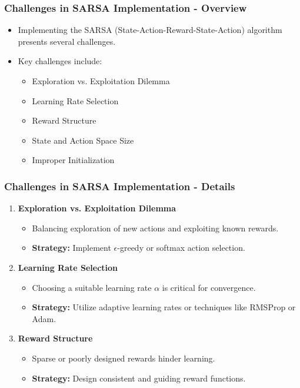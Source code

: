 \documentclass{beamer}
\begin{document}
\begin{frame}[fragile]
    \frametitle{Challenges in SARSA Implementation - Overview}
    \begin{itemize}
        \item Implementing the SARSA (State-Action-Reward-State-Action) algorithm presents several challenges.
        \item Key challenges include:
            \begin{itemize}
                \item Exploration vs. Exploitation Dilemma
                \item Learning Rate Selection
                \item Reward Structure
                \item State and Action Space Size
                \item Improper Initialization
            \end{itemize}
    \end{itemize}
\end{frame}

\begin{frame}[fragile]
    \frametitle{Challenges in SARSA Implementation - Details}
    \begin{enumerate}
        \item \textbf{Exploration vs. Exploitation Dilemma}
            \begin{itemize}
                \item Balancing exploration of new actions and exploiting known rewards.
                \item \textbf{Strategy:} Implement $\epsilon$-greedy or softmax action selection.
            \end{itemize}
        \item \textbf{Learning Rate Selection}
            \begin{itemize}
                \item Choosing a suitable learning rate $\alpha$ is critical for convergence.
                \item \textbf{Strategy:} Utilize adaptive learning rates or techniques like RMSProp or Adam.
            \end{itemize}
        \item \textbf{Reward Structure}
            \begin{itemize}
                \item Sparse or poorly designed rewards hinder learning.
                \item \textbf{Strategy:} Design consistent and guiding reward functions.
            \end{itemize}
    \end{enumerate}
\end{frame}
\end{document}
